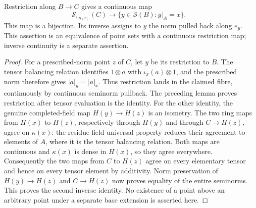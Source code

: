 \begin{theorem}
\label{spectrum:fibre-equivalence}
\leanok
{}
Restriction along $B\to C$ gives a continuous map
\[
 \mathcal S_{v_{H(x)}}(C)\longrightarrow
 \{y\in\mathcal S(B):y|_A=x\}.
\]
This map is a bijection. Its inverse assigns to $y$ the norm pulled back
along $e_y$. This assertion is an equivalence of point sets with a continuous
restriction map; inverse continuity is a separate assertion.
\end{theorem}
\begin{proof}
For a prescribed-norm point $z$ of $C$, let $y$ be its restriction to $B$.
The tensor balancing relation identifies $1\otimes a$ with
$\iota_x(a)\otimes1$, and the prescribed norm therefore gives
$|a|_y=|a|_x$. Thus restriction lands in the claimed fibre, continuously
by continuous seminorm pullback.
The preceding lemma proves restriction after tensor evaluation is the identity.
For the other identity, the genuine completed-field map $H(y)\to H(z)$
is an isometry. The two ring maps from $H(x)$ to $H(z)$, respectively
through $H(y)$ and through $C\to H(z)$, agree on $\kappa(x)$:
the residue-field universal property reduces their agreement to elements
of $A$, where it is the tensor balancing relation. Both maps are continuous
and $\kappa(x)$ is dense in $H(x)$, so they agree everywhere.
Consequently the two maps from $C$ to $H(z)$ agree on every elementary
tensor and hence on every tensor element by additivity. Norm preservation
of $H(y)\to H(z)$ and $C\to H(z)$ now proves equality of the entire
seminorms. This proves the second inverse identity.
No existence of a point above an arbitrary point under a separate base
extension is asserted here.
\end{proof}

